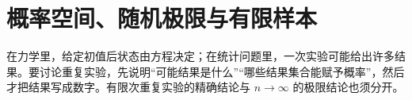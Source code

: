 \chapter{概率空间、随机极限与有限样本}
\label{chap:math-probability}

在力学里，给定初值后状态由方程决定；在统计问题里，一次实验可能给出许多结果。要讨论重复实验，先说明“可能结果是什么”“哪些结果集合能赋予概率”，然后才把结果写成数字。有限次重复实验的精确结论与 \(n\to\infty\) 的极限结论也须分开。






